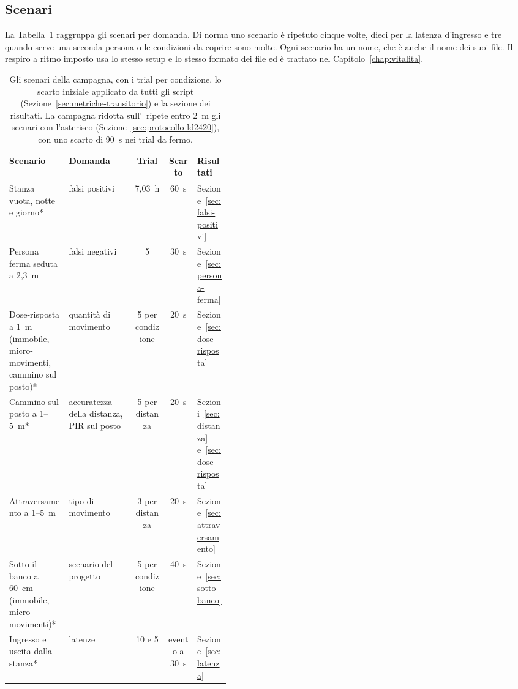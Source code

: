 \subsection{Scenari}
\label{sec:protocollo-scenari}

La Tabella~\ref{tab:scenari} raggruppa gli scenari per domanda. Di norma uno scenario è ripetuto
cinque volte, dieci per la latenza d'ingresso e tre quando serve una seconda persona o le
condizioni da coprire sono molte. Ogni scenario ha un nome, che è anche il nome dei suoi
file. Il respiro a ritmo imposto usa lo stesso setup e lo stesso formato dei file ed è trattato
nel Capitolo~\ref{chap:vitalita}.

\begin{table}[!htbp]
\centering
\caption{Gli scenari della campagna, con i trial per condizione, lo scarto iniziale
applicato da tutti gli script (Sezione~\ref{sec:metriche-transitorio}) e la sezione dei
risultati. La campagna ridotta sull'\ldc\ ripete entro 2~m gli scenari con l'asterisco
(Sezione~\ref{sec:protocollo-ld2420}), con uno scarto di 90~s nei trial da fermo.}
\label{tab:scenari}
\small
\begin{tabularx}{\linewidth}{@{}>{\raggedright\arraybackslash}p{0.27\linewidth}>{\raggedright\arraybackslash}Xcc>{\raggedright\arraybackslash}p{0.15\linewidth}@{}}
\toprule
\textbf{Scenario} & \textbf{Domanda} & \textbf{Trial} & \textbf{Scarto} & \textbf{Risultati} \\
\midrule
Stanza vuota, notte e giorno* & falsi positivi & 7,03~h & 60~s & Sezione~\ref{sec:falsi-positivi} \\
Persona ferma seduta a 2,3~m & falsi negativi & 5 & 30~s & Sezione~\ref{sec:persona-ferma} \\
Dose-risposta a 1~m (immobile, micro-movimenti, cammino sul posto)* & quantità di movimento & 5 per condizione & 20~s & Sezione~\ref{sec:dose-risposta} \\
Cammino sul posto a 1--5~m* & accuratezza della distanza, PIR sul posto & 5 per distanza & 20~s & Sezioni~\ref{sec:distanza} e~\ref{sec:dose-risposta} \\
Attraversamento a 1--5~m & tipo di movimento & 3 per distanza & 20~s & Sezione~\ref{sec:attraversamento} \\
Sotto il banco a 60~cm (immobile, micro-movimenti)* & scenario del progetto & 5 per condizione & 40~s & Sezione~\ref{sec:sotto-banco} \\
Ingresso e uscita dalla stanza* & latenze & 10 e 5 & evento a 30~s & Sezione~\ref{sec:latenza} \\

\end{tabularx}
\end{table}
